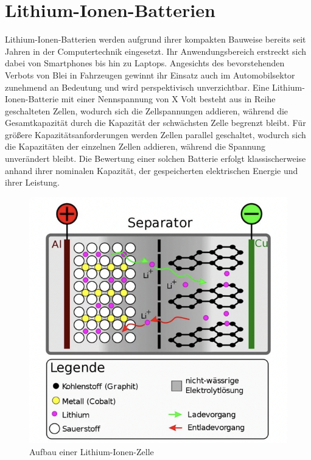 \section{Lithium-Ionen-Batterien}
Lithium-Ionen-Batterien werden aufgrund ihrer kompakten Bauweise bereits seit Jahren in der Computertechnik eingesetzt. Ihr Anwendungsbereich erstreckt sich dabei von Smartphones bis hin zu Laptops. Angesichts des bevorstehenden Verbots von Blei in Fahrzeugen gewinnt ihr Einsatz auch im Automobilsektor zunehmend an Bedeutung und wird perspektivisch unverzichtbar.\newline
Eine Lithium-Ionen-Batterie mit einer Nennspannung von X Volt besteht aus in Reihe geschalteten Zellen, wodurch sich die Zellspannungen addieren, während die Gesamtkapazität durch die Kapazität der schwächsten Zelle begrenzt bleibt. Für größere Kapazitätsanforderungen werden Zellen parallel geschaltet, wodurch sich die Kapazitäten der einzelnen Zellen addieren, während die Spannung unverändert bleibt. Die Bewertung einer solchen Batterie erfolgt klassischerweise anhand ihrer nominalen Kapazität, der gespeicherten elektrischen Energie und ihrer Leistung.

\begin{figure}[h]
	\centering
	\includegraphics[width=0.7\linewidth]{images/Li-Zelle}
	\caption{Aufbau einer Lithium-Ionen-Zelle \autocite{scinexx_akku_schattenseiten}}
	\label{fig:li-zelle}
\end{figure}

